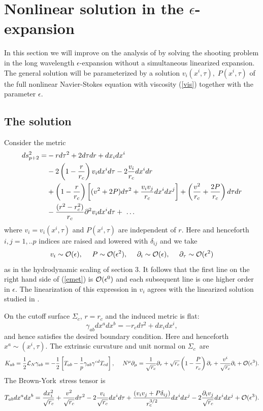 \documentclass{article}
\def\half{{1 \over 2}}
\def\beq{\begin{equation}}
\def\eeq{\end{equation}}
\def\p{\partial}
\def\g{{ \gamma}}
\def\d{{\delta}}
\def\e{{\epsilon}}
\def\cl{{\cal L}}
\def\sc{$\Sigma_c$}
\def\cO{\mathcal{O}}
\def\brownyork{Brown-York}
\begin{document}
\section{Nonlinear solution in the $\epsilon$-expansion}


In this section we will improve on the analysis of \cite{bkls} by solving  the shooting problem in the long wavelength $\epsilon$-expansion without a simultaneous linearized expansion. The general  solution will be parameterized by a solution $v_i(x^i, \tau), \; P(x^i,\tau)$ of the full nonlinear Navier-Stokes equation with viscosity (\ref{vis}) together with the parameter $\epsilon$.


\subsection{The solution}
Consider the metric
%
\begin{align}
ds_{p+2}^2 =&-r d\tau^2 + 2 d\tau dr + dx_i dx^i \notag\\
&-2\left(1-\frac{r}{r_c}\right) v_i dx^i d\tau -2\frac{v_i}{r_c} dx^i dr \label{emet}\\
&+{\left(1-\frac{r}{r_c}\right)}\left[ (v^2+2P) d\tau^2  +\frac{v_i v_j}{r_c} dx^i dx^j \right] + \left( \frac{v^2}{r_c} +\frac{2P}{r_c}\right) d\tau dr   \notag\\
&-{\frac{(r^2 - r_c^2)}{r_c}}\p^2 v_i dx^i d\tau
+~\ldots\notag
\end{align}
%
where $v_i=v_i( x^i,\tau)$ and $P ( x^i, \tau)$
are independent of $r$.
Here and henceforth  $i,j=1,..p$ indices are raised and lowered with $\d_{ij}$ and we take
%
\beq\label{orders}
v_i\sim {\cal O}(\e),~~~~P \sim {\cal O}(\e^2),~~~~\p_i \sim {\cal O}(\e),~~~~\p_\tau \sim {\cal O}(\e^2)
\eeq
%
as in the hydrodynamic scaling of section 3.
It follows that the first line on the right hand side of (\ref{emet}) is ${\cal O}(\e^0)$ and each subsequent line is one higher order in $\e$. The linearization of this expression in $v_i$ agrees with the linearized solution studied in \cite{bkls}.

On the cutoff surface \sc, $r=r_c$ and the induced metric is flat:
%
\beq
\g_{ab}dx^a dx^b=-r_c d\tau^2+dx_idx^i,
\eeq
%
and hence satisfies the desired boundary condition.  Here and henceforth $x^a \sim (x^i, \tau)$.
The extrinsic curvature and unit normal on \sc\ are
%
\beq
 K_{ab}=\half \cl_N \g_{ab}=-\frac{1}{2}\left[T_{ab}-{1 \over p}\g_{ab}\g^{cd}T_{cd}\right],~~~~
N^\mu\p_\mu = {1\over \sqrt{r_c}}\p_\tau + \sqrt{r_c}\left(1 -\frac{P}{r_c}\right)\p_r +\frac{v^i}{\sqrt{r_c}}\p_i +\cO(\e^3).
\eeq
%
The \brownyork\ stress tensor is
%
\beq  \label{dss} T_{ab}dx^adx^b = {dx_i^2\over \sqrt{r_c}} +\frac{v^2}{\sqrt{r_c}} d\tau^2-2 \frac{v_i}{\sqrt{r_c}} dx^id\tau+\frac{(v_iv_j +P \delta_{ij})}{r_c^{3/2}} dx^idx^j  -2\frac{\p_iv_j}{\sqrt{r_c}}dx^idx^j
%
+{\cal O}(\e^3).
\eeq
%
\end{document}
